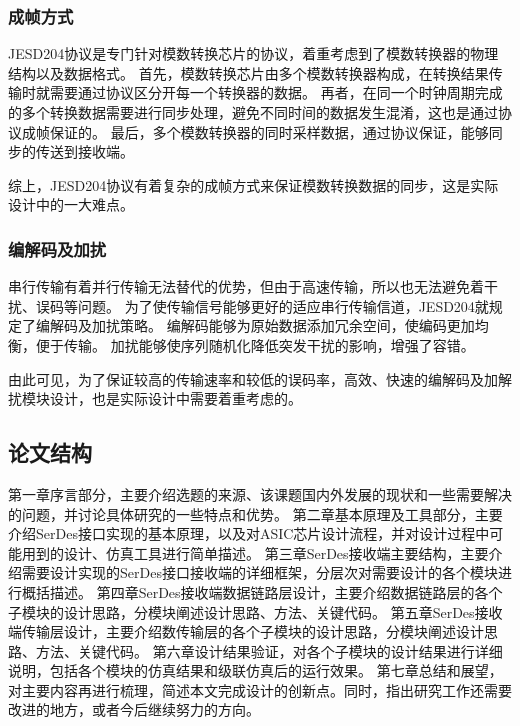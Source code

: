 \documentclass[UTF8]{ctexart}
\begin{document}
\subsubsection{成帧方式}

JESD204协议是专门针对模数转换芯片的协议，着重考虑到了模数转换器的物理结构以及数据格式。
首先，模数转换芯片由多个模数转换器构成，在转换结果传输时就需要通过协议区分开每一个转换器的数据。
再者，在同一个时钟周期完成的多个转换数据需要进行同步处理，避免不同时间的数据发生混淆，这也是通过协议成帧保证的。
最后，多个模数转换器的同时采样数据，通过协议保证，能够同步的传送到接收端。

综上，JESD204协议有着复杂的成帧方式来保证模数转换数据的同步，这是实际设计中的一大难点。

\subsubsection{编解码及加扰}

串行传输有着并行传输无法替代的优势，但由于高速传输，所以也无法避免着干扰、误码等问题。
为了使传输信号能够更好的适应串行传输信道，JESD204就规定了编解码及加扰策略。
编解码能够为原始数据添加冗余空间，使编码更加均衡，便于传输。
加扰能够使序列随机化降低突发干扰的影响，增强了容错。

由此可见，为了保证较高的传输速率和较低的误码率，高效、快速的编解码及加解扰模块设计，也是实际设计中需要着重考虑的。

\subsection{论文结构}

第一章序言部分，主要介绍选题的来源、该课题国内外发展的现状和一些需要解决的问题，并讨论具体研究的一些特点和优势。
第二章基本原理及工具部分，主要介绍SerDes接口实现的基本原理，以及对ASIC芯片设计流程，并对设计过程中可能用到的设计、仿真工具进行简单描述。
第三章SerDes接收端主要结构，主要介绍需要设计实现的SerDes接口接收端的详细框架，分层次对需要设计的各个模块进行概括描述。
第四章SerDes接收端数据链路层设计，主要介绍数据链路层的各个子模块的设计思路，分模块阐述设计思路、方法、关键代码。
第五章SerDes接收端传输层设计，主要介绍数传输层的各个子模块的设计思路，分模块阐述设计思路、方法、关键代码。
第六章设计结果验证，对各个子模块的设计结果进行详细说明，包括各个模块的仿真结果和级联仿真后的运行效果。
第七章总结和展望，对主要内容再进行梳理，简述本文完成设计的创新点。同时，指出研究工作还需要改进的地方，或者今后继续努力的方向。


\end{document}
